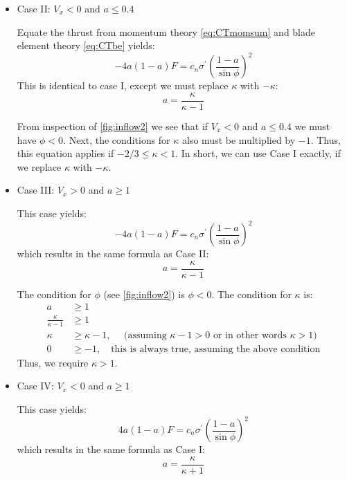 \documentclass{article}
\begin{document}
\begin{itemize}
\item Case II: $V_x < 0$ and $a \le 0.4$

Equate the thrust from momentum theory \cref{eq:CTmomsum} and blade element theory \cref{eq:CTbe} yields:
\begin{equation}
    - 4 a (1 - a) F = c_n \sigma^\prime \left(\frac{1-a}{\sin\phi}\right)^2
\end{equation}
This is identical to case I, except we must replace $\kappa$ with $-\kappa$:
\begin{equation}
    a = \frac{\kappa}{\kappa - 1}
\end{equation}

From inspection of \cref{fig:inflow2} we see that if $V_x < 0$ and $a \le 0.4$ we must have $\phi < 0$.  Next, the conditions for $\kappa$ also must be multiplied by $-1$.  Thus, this equation applies if $-2/3 \le \kappa < 1$.  In short, we can use Case I exactly, if we replace $\kappa$ with $-\kappa$.


\item Case III: $V_x > 0$ and $a \ge 1$

This case yields:
\begin{equation}
    - 4 a (1 - a) F = c_n \sigma^\prime \left(\frac{1-a}{\sin\phi}\right)^2
\end{equation}
which results in the same formula as Case II:
\begin{equation}
    a = \frac{\kappa}{\kappa - 1}
\end{equation}

The condition for $\phi$ (see \cref{fig:inflow2}) is $\phi < 0$.  The condition for $\kappa$ is:
\begin{equation}
    \begin{aligned}
        a &\ge 1\\
        \frac{\kappa}{\kappa -1} &\ge 1\\
        \kappa &\ge \kappa -1,\quad \text{ (assuming $\kappa - 1 > 0$ or in other words $\kappa > 1$)} \\
        0 &\ge -1,\quad \text{this is always true, assuming the above condition}
    \end{aligned}
\end{equation}
Thus, we require $\kappa > 1$.

\item Case IV: $V_x < 0$ and $a \ge 1$

This case yields:
\begin{equation}
    4 a (1 - a) F = c_n \sigma^\prime \left(\frac{1-a}{\sin\phi}\right)^2
\end{equation}
which results in the same formula as Case I:
\begin{equation}
    a = \frac{\kappa}{\kappa + 1}
\end{equation}


\end{itemize}
\end{document}
